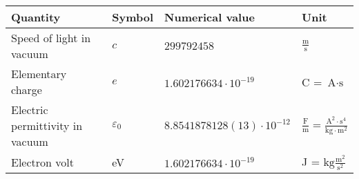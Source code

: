 \begin{tabular}{llll}
\hline
Quantity                        & Symbol & Numerical value                              & Unit \\
\hline
Speed of light in vacuum        & $c$             & $299792458$                         & $\frac{\text{m}}{\text{s}}$                  \\
Elementary charge               & $e$             & $1.602176634 \cdot 10^{-19}$        & C = $\text{A}\cdot\text{s}$                  \\
Electric permittivity in vacuum & $\varepsilon_0$ & $8.8541878128(13) \cdot 10^{-12}$   & $\frac{\text{F}}{\text{m}} = \frac{\text{A}^2\cdot\text{s}^4}{\text{kg}\cdot\text{m}^2}$ \\
Electron volt                   &  eV             & $1.602176634 \cdot 10^{-19}$        & J = $\text{kg}\frac{\text{m}^2}{\text{s}^2}$ \\
\hline
\end{tabular}
